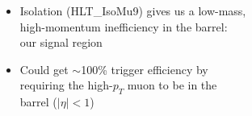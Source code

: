 \documentclass[compress]{beamer}
\begin{document}
\begin{frame}
\begin{columns}
\end{columns}

\hfill \mbox{\hspace{-0.48 cm}}

\vspace{-3 cm}
\begin{itemize}
\item Isolation (HLT\_IsoMu9) gives us a low-mass, \\ high-momentum inefficiency in the barrel: \\
our signal region

\item Could get $\sim$100\% trigger efficiency by \\ requiring the
  high-$p_T$ muon to be in the \\ barrel ($|\eta| < 1$)
\end{itemize}
\end{frame}
\end{document}
